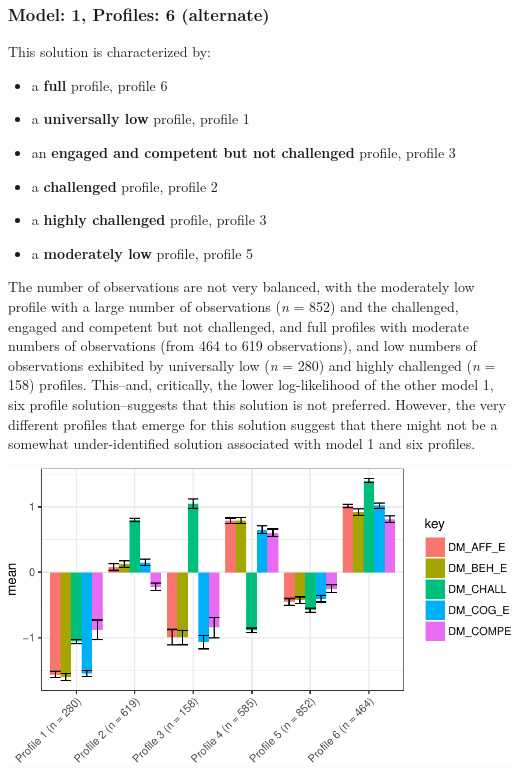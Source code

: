 \documentclass[]{msu-thesis}
\providecommand{\tightlist}{%
  \setlength{\itemsep}{0pt}\setlength{\parskip}{0pt}}
\theoremstyle{definition}
\theoremstyle{definition}
\theoremstyle{definition}
\theoremstyle{remark}
\begin{document}
\subsubsection{Model: 1, Profiles: 6
(alternate)}\label{model-1-profiles-6-alternate}

This solution is characterized by:

\begin{itemize}
\tightlist
\item
  a \textbf{full} profile, profile 6
\item
  a \textbf{universally low} profile, profile 1
\item
  an \textbf{engaged and competent but not challenged} profile, profile
  3
\item
  a \textbf{challenged} profile, profile 2
\item
  a \textbf{highly challenged} profile, profile 3
\item
  a \textbf{moderately low} profile, profile 5
\end{itemize}

The number of observations are not very balanced, with the moderately
low profile with a large number of observations (\emph{n} = 852) and the
challenged, engaged and competent but not challenged, and full profiles
with moderate numbers of observations (from 464 to 619 observations),
and low numbers of observations exhibited by universally low (\emph{n} =
280) and highly challenged (\emph{n} = 158) profiles. This--and,
critically, the lower log-likelihood of the other model 1, six profile
solution--suggests that this solution is not preferred. However, the
very different profiles that emerge for this solution suggest that there
might not be a somewhat under-identified solution associated with model
1 and six profiles.

\begin{center}\includegraphics[width=0.8\linewidth]{rosenberg-dissertation_files/figure-latex/m1_6p-alt-1} \end{center}
\end{document}
